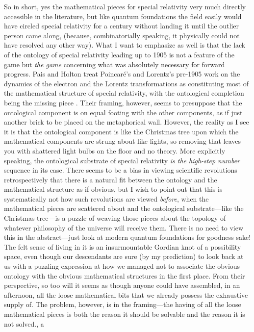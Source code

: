 \documentclass{article}
\begin{document}
{So in short, yes the mathematical pieces for special relativity very much directly accessible in the literature, but like quantum foundations the field easily would have circled special relativity for a century without landing it until the outlier person came along, (because, combinatorially speaking, it physically could not have resolved any other way). What I want to emphasize as well is that the lack of the ontology of special relativity leading up to 1905 is not a feature of the game but \textit{the game} concerning what was absolutely necessary for forward progress. Pais and Holton treat Poincaré's and Lorentz's pre-1905 work on the dynamics of the electron and the Lorentz transformations as constituting most of the mathematical structure of special relativity, with the ontological completion being the missing piece \cite{pais1982subtle, holton1988thematic}. Their framing, however, seems to presuppose that the ontological component is on equal footing with the other components, as if just another brick to be placed on the metaphorical wall. However, the reality as I see it is that the ontological component is like the Christmas tree upon which the mathematical components are strung about like lights, so removing that leaves you with shattered light bulbs on the floor and no theory. More explicitly speaking, the ontological substrate of special relativity \textit{is the high-step number} sequence in its case. There seems to be a bias in viewing scientific revolutions retrospectively that there is a natural fit between the ontology and the mathematical structure as if obvious, but I wish to point out that this is systematically not how such revolutions are viewed \textit{before}, when the mathematical pieces are scattered about and the ontological substrate---like the Christmas tree---is a puzzle of weaving those pieces about the topology of whatever philosophy of the universe will receive them. There is no need to view this in the abstract---just look at modern quantum foundations for goodness sake! The felt sense of living in it is an insurmountable Gordian knot of a possibility space, even though our descendants are sure (by my prediction) to look back at us with a puzzling expression at how we managed not to associate the obvious ontology with the obvious mathematical structures in the first place. From their perspective, so too will it seems as though anyone could have assembled, in an afternoon, all the loose mathematical bits that we already possess the exhaustive supply of. The problem, however, is in the framing---the having of all the loose mathematical pieces is both the reason it should be solvable and the reason it is not solved.}, a
\end{document}
